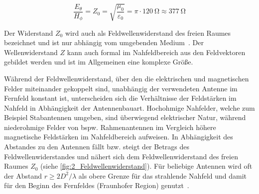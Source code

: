 \begin{equation}
    \frac{E_{\theta}}{H_{\phi}} = Z_0 = \sqrt{\frac{\mu_0}{\varepsilon_0}} = \pi \cdot \SI{120}{\ohm} \approx \SI{377}{\ohm}
\end{equation}

Der Widerstand $Z_0$ wird auch als Feldwellenwiderstand des freien Raumes bezeichnet und ist nur abhängig vom umgebenden Medium~\cite{EMV}. Der Wellenwiderstand $Z$ kann auch formal im Nahfeldbereich aus den Feldvektoren gebildet werden und ist im Allgemeinen eine komplexe Größe.
\par
\vspace{\linespace}
Während der Feldwellenwiderstand, über den die elektrischen und magnetischen Felder miteinander gekoppelt sind, unabhängig der verwendeten Antenne im Fernfeld konstant ist, unterscheiden sich die Verhältnisse der Feldstärken im Nahfeld in Abhängigkeit der Antennenbauart. Hochohmige Nahfelder, welche zum Beispiel Stabantennen umgeben, sind überwiegend elektrischer Natur, während niederohmige Felder von bspw. Rahmenantennen im Vergleich höhere magnetische Feldstärken im Nahfeldbereich aufweisen. In Abhängigkeit des Abstandes zu den Antennen fällt bzw. steigt der Betrags des Feldwellenwiderstandes und nähert sich dem Feldwellenwiderstand des freien Raumes $Z_0$ (siehe \Abb \ref{fig:2_Feldwellenwiderstand}). Für beliebige Antennen wird oft der Abstand $r\geq 2 D^2 / \lambda$ als obere Grenze für das strahlende Nahfeld und damit für den Beginn des Fernfeldes (Fraunhofer Region) genutzt~\cite{Antenna_Theory}.  


